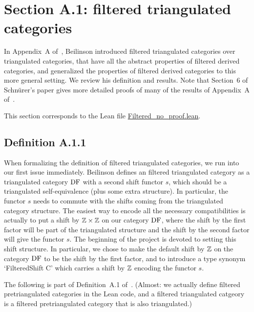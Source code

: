 \chapter{Section A.1: filtered triangulated categories}

In Appendix~A of~\cite{Be1}, Beilinson introduced filtered triangulated 
categories over triangulated categories, that have all the abstract properties of filtered
derived categories, and generalized the properties of filtered derived categories to this more general setting. We review his definition and results.
Note that Section~6 of Schn\"urer's paper \cite{Schnur} gives more detailed proofs of many of the results of Appendix~A of~\cite{Be1}.

This section corresponds to the Lean file \url{Filtered_no_proof.lean}.

\section{Definition A.1.1}

When formalizing the definition of filtered triangulated 
categories, we run into our first issue immediately. Beilinson defines an filtered triangulated category as a triangulated
category $\operatorname{DF}$ with a second shift functor $s$, which should be a triangulated self-equivalence (plus some extra structure). In particular,
the functor $s$ needs to commute with the shifts coming from the triangulated category structure. The easiest way to encode all
the necessary compatibilities is actually to put a shift by $\mathbb{Z} \times \mathbb{Z}$ on our category $\operatorname{DF}$, where the shift by the first factor
will be part of the triangulated structure and the shift by the second factor will give the functor $s$. The beginning of the project
is devoted to setting this shift structure. In particular, we chose to make the default shift by $\mathbb{Z}$ on the  category $\operatorname{DF}$ to be the
shift by the first factor, and to introduce a type synonym `FilteredShift C' which carries a shift by $\mathbb{Z}$ encoding the functor  $s$.

The following is part of Definition~A.1 of~\cite{Be1}. (Almost: we actually define filtered pretriangulated categories in the Lean code,
and a filtered triangulated catgeory is a filtered pretriangulated category that is also triangulated.)

